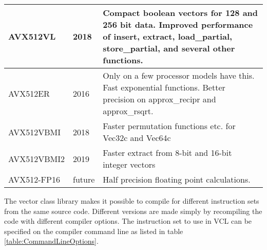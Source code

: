 \documentclass[vcl_manual.tex]{subfiles}
\begin{document}
\begin {table}[h]
\begin{tabular}{|p{24mm}|p{22mm}|p{100mm}|}
AVX512VL & 2018 & Compact boolean vectors for 128 and 256 bit data. 
Improved performance of insert, extract, load\_partial, store\_partial, and several other functions. \\ \hline
AVX512ER & 2016 & Only on a few processor models have this. Fast exponential functions. Better precision on approx\_recipr and approx\_rsqrt. \\ \hline
AVX512VBMI & 2018 & Faster permutation functions etc. for Vec32c and Vec64c \\ \hline
AVX512VBMI2 & 2019 & Faster extract from 8-bit and 16-bit integer vectors \\ \hline
AVX512-FP16 & future & Half precision floating point calculations. \\ \hline
\end{tabular}
\end{table}

The vector class library makes it possible to compile for different instruction sets from the same source code. Different versions are made simply by recompiling the code with different compiler options. The instruction set to use in VCL can be specified on the compiler command line as listed in table \ref{table:CommandLineOptions}.
\end{document}
